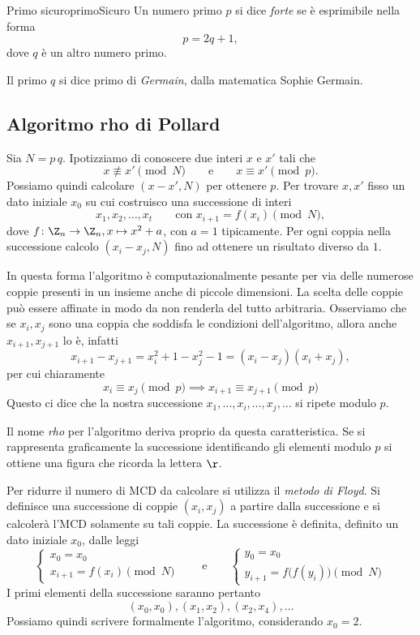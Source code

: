 	\begin{defn}{Primo sicuro}{primoSicuro}
	Un numero primo \(p\) si dice \emph{forte} se è esprimibile nella forma
		\[
		p = 2q+1,
		\]
	dove \(q\) è un altro numero primo.
	\end{defn}

	\begin{notz}
	Il primo \(q\) si dice primo di \emph{Germain}, dalla matematica Sophie Germain.
	\end{notz}

	\subsection{Algoritmo rho di Pollard}

	Sia \(N=p\,q\). Ipotizziamo di conoscere due interi \(x\) e \(x'\) tali che
		\[
		x \not\equiv x' \pmod{N} \qquad\text{e}\qquad x \equiv x' \pmod{p}.
		\]
	Possiamo quindi calcolare \((x-x',N)\) per ottenere \(p\).
	Per trovare \(x,x'\) fisso un dato iniziale \(x_0\) su cui costruisco una successione di interi
		\[
		x_1, x_2, \ldots, x_t \qquad\text{con }x_{i+1} = f(x_i) \pmod{N},
		\]
	dove \(f\colon \Z_n \to \Z_n, x \mapsto x^2+a\), con \(a=1\) tipicamente.
	Per ogni coppia nella successione calcolo \((x_i-x_j,N)\) fino ad ottenere un risultato diverso da \(1\).

	In questa forma l'algoritmo è computazionalmente pesante per via delle numerose coppie presenti in un insieme anche di piccole dimensioni.
	La scelta delle coppie può essere affinate in modo da non renderla del tutto arbitraria.
	Osserviamo che se \(x_i,x_j\) sono una coppia che soddisfa le condizioni dell'algoritmo, allora anche \(x_{i+1},x_{j+1}\) lo è, infatti
		\[
		x_{i+1}-x_{j+1} = x_i^2+1-x_j^2-1 = (x_i-x_j)(x_i+x_j),
		\]
	per cui chiaramente
		\[
		x_i \equiv x_j \pmod{p} \implies x_{i+1} \equiv x_{j+1} \pmod{p}
		\]
	Questo ci dice che la nostra successione \(x_1,\ldots,x_i,\ldots, x_j, \ldots\) si ripete modulo \(p\).

	\begin{oss}
	Il nome \emph{rho} per l'algoritmo deriva proprio da questa caratteristica.
	Se si rappresenta graficamente la successione identificando gli elementi modulo \(p\) si ottiene una figura che ricorda la lettera \(\r\).
	\end{oss}

	Per ridurre il numero di MCD da calcolare si utilizza il \emph{metodo di Floyd}.
	Si definisce una successione di coppie \((x_i,x_j)\) a partire dalla successione e si calcolerà l'MCD solamente su tali coppie.
	La successione è definita, definito un dato iniziale \(x_0\), dalle leggi
		\[
		\begin{cases}
		x_0 = x_0\\
		x_{i+1} = f(x_i) \pmod{N}
		\end{cases}
		\qquad\text{e}\qquad
		\begin{cases}
		y_0 = x_0\\
		y_{i+1} = f\big(f(y_i)\big) \pmod{N}
		\end{cases}
		\]
	I primi elementi della successione saranno pertanto
		\[
		(x_0,x_0), (x_1,x_2), (x_2,x_4), \ldots
		\]
	Possiamo quindi scrivere formalmente l'algoritmo, considerando \(x_0=2\).

